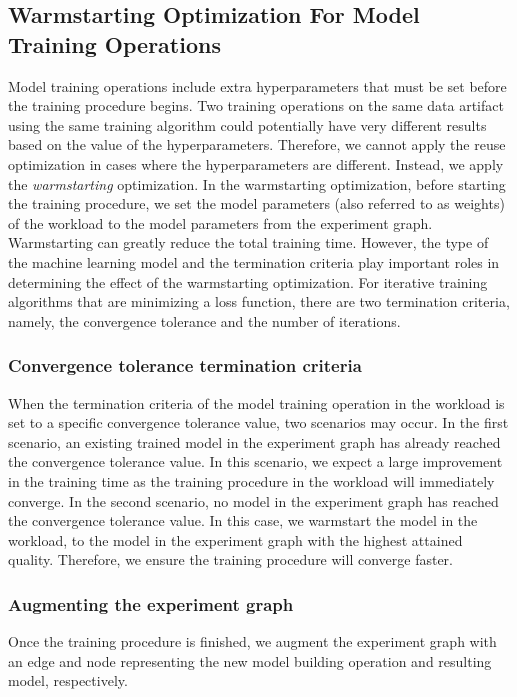 \subsection{Warmstarting Optimization For Model Training Operations}
Model training operations include extra hyperparameters that must be set before the training procedure begins.
Two training operations on the same data artifact using the same training algorithm could potentially have very different results based on the value of the hyperparameters.
Therefore, we cannot apply the reuse optimization in cases where the hyperparameters are different.
Instead, we apply the \textit{warmstarting} optimization.
In the warmstarting optimization, before starting the training procedure, we set the model parameters (also referred to as weights) of the workload to the model parameters from the experiment graph.
Warmstarting can greatly reduce the total training time.
However, the type of the machine learning model and the termination criteria play important roles in determining the effect of the warmstarting optimization.
For iterative training algorithms that are minimizing a loss function, there are two termination criteria, namely, the convergence tolerance and the number of iterations.

\subsubsection{Convergence tolerance termination criteria}
When the termination criteria of the model training operation in the workload is set to a specific convergence tolerance value, two scenarios may occur.
In the first scenario, an existing trained model in the experiment graph has already reached the convergence tolerance value.
In this scenario, we expect a large improvement in the training time as the training procedure in the workload will immediately converge.
In the second scenario, no model in the experiment graph has reached the convergence tolerance value.
In this case, we warmstart the model in the workload, to the model in the experiment graph with the highest attained quality.
Therefore, we ensure the training procedure will converge faster.

\subsubsection{Augmenting the experiment graph}
Once the training procedure is finished, we augment the experiment graph with an edge and node representing the new model building operation and resulting model, respectively.


